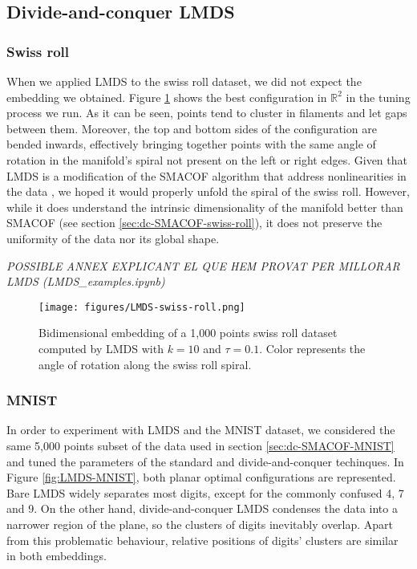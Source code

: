 \subsection{Divide-and-conquer LMDS}

\subsubsection{Swiss roll}

When we applied LMDS to the swiss roll dataset, we did not expect the embedding we obtained. Figure \ref{fig:LMDS-swiss-roll} shows the best configuration in $\mathbb{R}^2$ in the tuning process we run. As it can be seen, points tend to cluster in filaments and let gaps between them. Moreover, the top and bottom sides of the configuration are bended inwards, effectively bringing together points with the same angle of rotation in the manifold's spiral not present on the left or right edges. Given that LMDS is a modification of the SMACOF algorithm that address nonlinearities in the data \citep{Chen2009}, we hoped it would properly unfold the spiral of the swiss roll. However, while it does understand the intrinsic dimensionality of the manifold better than SMACOF (see section \ref{sec:dc-SMACOF-swiss-roll}), it does not preserve the uniformity of the data nor its global shape.

\textit{POSSIBLE ANNEX EXPLICANT EL QUE HEM PROVAT PER MILLORAR LMDS (LMDS\_examples.ipynb)}

\begin{figure}[ht]
    \centering
    \texttt{[image: figures/LMDS-swiss-roll.png]}
    \caption{Bidimensional embedding of a 1,000 points swiss roll dataset \citep{Spiwokv2007} computed by LMDS with $k=10$ and $\tau = 0.1$. Color represents the angle of rotation along the swiss roll spiral.}
    \label{fig:LMDS-swiss-roll}
\end{figure}

\subsubsection{MNIST}

In order to experiment with LMDS and the MNIST dataset, we considered the same 5,000 points subset of the data used in section \ref{sec:dc-SMACOF-MNIST} and tuned the parameters of the standard and divide-and-conquer techinques. In Figure \ref{fig:LMDS-MNIST}, both planar optimal configurations are represented. Bare LMDS widely separates most digits, except for the commonly confused 4, 7 and 9. On the other hand, divide-and-conquer LMDS condenses the data into a narrower region of the plane, so the clusters of digits inevitably overlap. Apart from this problematic behaviour, relative positions of digits' clusters are similar in both embeddings.

